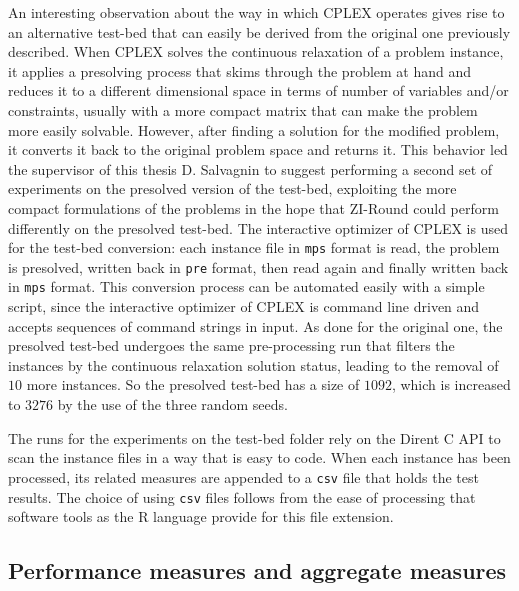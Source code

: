 \documentclass[a4paper,12pt]{book}
\begin{document}
An interesting observation about the way in which CPLEX operates gives rise to an alternative test-bed that can easily be derived from the original one previously described.
When CPLEX solves the continuous relaxation of a problem instance, it applies a presolving process that skims through the problem at hand and reduces it to a different dimensional space in terms of number of variables and/or constraints, usually with a more compact matrix that can make the problem more easily solvable. However, after finding a solution for the modified problem, it converts it back to the original problem space and returns it. This behavior led the supervisor of this thesis D. Salvagnin to suggest performing a second set of experiments on the presolved version of the test-bed, exploiting the more compact formulations of the problems in the hope that ZI-Round could perform differently on the presolved test-bed. The interactive optimizer of CPLEX is used for the test-bed conversion: each instance file in \texttt{mps} format is read, the problem is presolved, written back in \texttt{pre} format, then read again and finally written back in \texttt{mps} format. This conversion process can be automated easily with a simple script, since the interactive optimizer of CPLEX is command line driven and accepts sequences of command strings in input. As done for the original one, the presolved test-bed undergoes the same pre-processing run that filters the instances by the continuous relaxation solution status, leading to the removal of $10$ more instances. So the presolved test-bed has a size of $1092$, which is increased to $3276$ by the use of the three random seeds. \par

The runs for the experiments on the test-bed folder rely on the Dirent C API to scan the instance files in a way that is easy to code. When each instance has been processed, its related measures are appended to a \texttt{csv} file that holds the test results. The choice of using \texttt{csv} files follows from the ease of processing that software tools as the R language provide for this file extension.

\subsection{Performance measures and aggregate measures}
\end{document}
